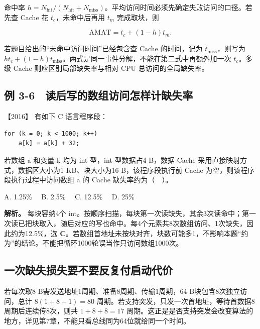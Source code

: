 命中率 \(h=N_{\mathrm{hit}}/(N_{\mathrm{hit}}+N_{\mathrm{miss}})\)。平均访问时间必须先确定失败访问的口径。若先查 Cache 花 \(t_c\)，未命中后再用 \(t_m\) 完成取块，则

\[
\mathrm{AMAT}=t_c+(1-h)t_m.
\]

若题目给出的``未命中访问时间''已经包含查 Cache 的时间，记为 \(t_{\mathrm{miss}}\)，则写为 \(ht_c+(1-h)t_{\mathrm{miss}}\)。两式是同一事件分解，不能在第二式中再额外加一次 \(t_c\)。多级 Cache 则应区别局部缺失率与相对 CPU 总访问的全局缺失率。

\subsection{例 3-6　读后写的数组访问怎样计缺失率}\label{co-ex3-6}

\noindent{}【2016】 有如下 C 语言程序段：

\par\medskip\noindent
\begin{minipage}{\linewidth}
\begin{verbatim}
for (k = 0; k < 1000; k++)
    a[k] = a[k] + 32;
\end{verbatim}
\end{minipage}\par\medskip

若数组 a 和变量 k 均为 int 型，int 型数据占4 B，数据 Cache 采用直接映射方式，数据区大小为1 KB、块大小为16 B，该程序段执行前 Cache 为空，则该程序段执行过程中访问数组 a 的 Cache 缺失率约为（　）。

A. 1.25\%　 B. 2.5\%　 C. 12.5\%　 D. 25\%


\textbf{解析。} 每块容纳4个 int。按顺序扫描，每块第一次读缺失，其余3次读命中；第一次读已把块取入，随后对应的写也命中。每4个元素共8次数组访问、1次缺失，因此约为12.5\%，选 \textbf{C}。若数组首地址未按块对齐，块数可能多1，不影响本题``约为''的结论。不能把循环1000轮误当作只访问数组1000次。

\subsection{一次缺失损失要不要反复付启动代价}\label{co-c03-h137}

若每次取8 B需发送地址1周期、准备8周期、传输1周期，64 B块包含8次独立访问，总计 \(8(1+8+1)=80\) 周期。若支持突发，只发一次首地址，等待首数据8周期后连续传8次，则共 \(1+8+8=17\) 周期。这正是是否支持突发会改变算法的地方，详见第7章，不能只看总线同为64位就给同一个时间。

